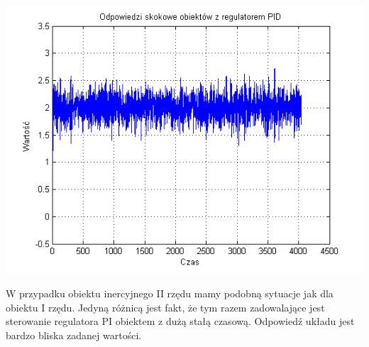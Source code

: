 \documentclass[10pt,a4paper]{article}
\begin{document}
\includegraphics[scale=1]{images/cztery/skrypt_04.png}\\
\newpage

W przypadku obiektu inercyjnego II rzędu mamy podobną sytuacje jak dla obiektu I rzędu. Jedyną różnicą jest fakt, że tym razem zadowalające jest sterowanie regulatora PI obiektem z dużą stałą czasową. Odpowiedź układu jest bardzo bliska zadanej wartości.
\newpage
\end{document}
